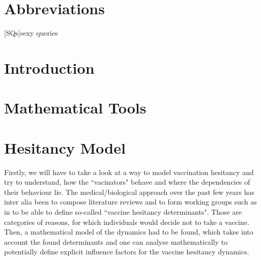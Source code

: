 \documentclass[12pt,a4paper,twoside]{article}
\begin{document}
\newpage
\tableofcontents
\newpage

\pagestyle{headings}

\newpage


\section*{Abbreviations}
\begin{acronym}[KPMG]%
	[SQs]{sexy queries}
\end{acronym}

\section{Introduction}
%	

\section{Mathematical Tools}

\section{Hesitancy Model}
Firstly, we will have to take a look at a way to model vaccination hesitancy and try to understand, how the ``vacinators" behave and where the dependencies of their behaviour lie. The medical/biological approach over the past few years has inter alia been to compose literature reviews and to form working groups such as in \cite{MacDonald2015} to be able to define so-called ``vaccine hesitancy determinants". Those are categories of reasons, for which individuals would decide not to take a vaccine. Then, a mathematical model of the dynamics had to be found, which takes into account the found determinants and one can analyse mathematically to potentially define explicit influence factors for the vaccine hesitancy dynamics. 
\end{document}
